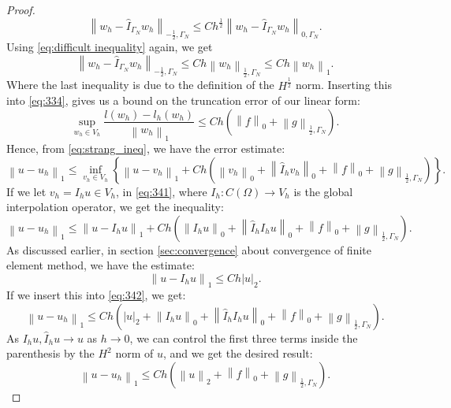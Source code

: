 \documentclass[../Main/main.tex]{subfiles}
\begin{document}
\begin{proof}
\begin{equation}
				\left \|w_h-\hat{I}_{\Gamma_N} w_h\right \|_{-\frac{1}{2},\Gamma_N} \leq Ch^{\frac{1}{2}} \left \| w_h-\hat{I}_{\Gamma_N} w_h \right \|_{0,\Gamma_N}.
		\end{equation}
		Using \eqref{eq:difficult inequality} again, we get
		\begin{equation}
				\left \|w_h-\hat{I}_{\Gamma_N} w_h\right \|_{-\frac{1}{2},\Gamma_N} \leq Ch \left \|w_h\right \|_{\frac{1}{2},\Gamma_N} \leq Ch\left \| w_h \right \|_1.
		\end{equation}
		Where the last inequality is due to the definition of the $H^{\frac{1}{2}}$ norm. Inserting this into \eqref{eq:334}, gives us a bound on the truncation error of our linear form:
		\begin{equation}
			\sup_{w_h \in V_h} \frac{l(w_h)-l_h(w_h)}{\left \| w_h \right \|_1} \leq Ch(\left \|f \right \|_0 + \left \| g \right \|_{\frac{1}{2},\Gamma_N}).
		\end{equation}
		Hence, from \eqref{eq:strang_ineq}, we have the error estimate:
		\begin{equation}\label{eq:341}
					\left \| u - u_h \right \|_1 \leq \inf_{v_h \in V_h}\left \{ \left \| u - v_h \right \|_1 + Ch \left (\left \| v_h\right \|_0 + \left \| \hat{I}_h v_h \right \|_0 + \left \| f \right \|_0 + \left \| g \right \|_{\frac{1}{2},\Gamma_N}\right ) \right \}.
		\end{equation}
	If we let $v_h = I_h u \in V_h$, in \eqref{eq:341}, where $I_h:C(\Omega) \rightarrow V_h$ is the global interpolation operator, we get the inequality:
	\begin{equation}\label{eq:342}
	\left \| u - u_h \right \|_1 \leq \left \| u - I_h u \right \|_1 + Ch \left (\left \| I_h u\right \|_0 + \left \| \hat{I}_h I_h u \right \|_0 + \left \| f \right \|_0 + \left \| g \right \|_{\frac{1}{2},\Gamma_N} \right ).
	\end{equation}
	As discussed earlier, in section \ref{sec:convergence} about convergence of finite element method, we have the estimate:
	\begin{equation}
 \left \| u - I_h u \right \|_1 \leq C h|u|_2.
	\end{equation}
	If we insert this into \eqref{eq:342}, we get:
	\begin{equation}
	\left \| u - u_h \right \|_1 \leq  Ch \left ( |u|_2 + \left \| I_h u\right \|_0 + \left \| \hat{I}_h I_h u \right \|_0 + \left \| f \right \|_0 + \left \| g \right \|_{\frac{1}{2},\Gamma_N} \right ).
	\end{equation}
	As $I_h u, \hat{I}_h u \rightarrow u$ as $h\rightarrow 0$, we can control the first three terms inside the parenthesis by the $H^2$ norm of $u$, and we get the desired result:
	\begin{equation}
\left \| u - u_h \right \|_1 \leq  Ch \left ( \left \|u\right \|_2 + \left \| f \right \|_0 + \left \| g \right \|_{\frac{1}{2},\Gamma_N} \right ).	\end{equation}
	\end{proof}
\end{document}
